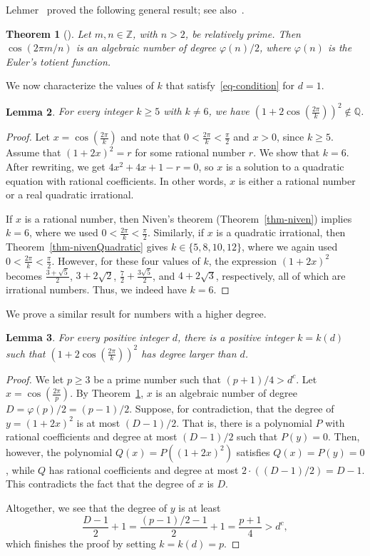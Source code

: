 \documentclass{article}
\newtheorem{theorem}{Theorem}
\newtheorem{lemma}[theorem]{Lemma}
\begin{document}
Lehmer~\cite{lehmer33} proved the following general result; see also~\cite{pss24}.

\begin{theorem}[\cite{lehmer33}]
\label{thm-lehmer}
Let $m, n \in \mathbb{Z}$, with $n > 2$, be relatively prime.
Then $\cos(2\pi m/n)$ is an algebraic
number of degree $\varphi(n)/2$, where $\varphi(n)$ is the Euler’s totient function.
\end{theorem}

We now characterize the values of $k$ that satisfy~\eqref{eq-condition} for $d=1$.

\begin{lemma}
\label{lem-classification}
For every integer $k \geq 5$ with $k \neq 6$, we have $\left(1+2\cos\left(\frac{2\pi}{k}\right)\right)^2 \notin \mathbb{Q}$.
\end{lemma}
\begin{proof}
Let $x=\cos\left(\frac{2\pi}{k}\right)$ and note that $0< \frac{2\pi}{k} < \frac{\pi}{2}$ and $x>0$, since $k \geq 5$.
Assume that $(1+2x)^2 = r$ for some rational number $r$.
We show that $k=6$.
After rewriting, we get $4x^2+4x+1-r=0$, so $x$ is a solution to a quadratic equation with rational coefficients.
In other words, $x$ is either a rational number or a real quadratic irrational.

If $x$ is a rational number, then Niven's theorem (Theorem~\ref{thm-niven}) implies $k = 6$, where we used $0<\frac{2\pi}{k}<\frac{\pi}{2}$.
Similarly, if $x$ is a quadratic irrational, then Theorem~\ref{thm-nivenQuadratic} gives $k \in \{5,8,10,12\}$, where we again used $0<\frac{2\pi}{k}<\frac{\pi}{2}$.
However, for these four values of $k$, the expression $(1+2x)^2$ becomes $\frac{3+\sqrt{5}}{2}$, $3+2\sqrt{2}$, $\frac{7}{2} +\frac{3\sqrt{5}}{2}$, and $4+2\sqrt{3}$, respectively, all of which are irrational numbers.
Thus, we indeed have $k=6$.
\end{proof}

We prove a similar result for numbers with a higher degree.

\begin{lemma}
\label{lem-higherDegree}
For every positive integer $d$, there is a positive integer $k = k(d)$ such that $\left(1+2\cos\left(\frac{2\pi}{k}\right)\right)^2$ has degree larger than $d$.
\end{lemma}
\begin{proof}
We let $p \geq 3$ be a prime number such that $(p+1)/4 > d^c$.
Let $x = \cos\left(\frac{2\pi}{p}\right)$.
By Theorem~\ref{thm-lehmer}, $x$ is an algebraic number of degree $D=\varphi(p)/2=(p-1)/2$.
Suppose, for contradiction, that the degree of $y=(1+2x)^2$ is at most $(D-1)/2$.
That is, there is a polynomial $P$ with rational coefficients and degree at most $(D-1)/2$ such that $P(y)=0$.
Then, however, the polynomial $Q(x) = P((1+2x)^2)$ satisfies $Q(x)=P(y)=0$, while $Q$ has rational coefficients and degree at most $2 \cdot ((D-1)/2)=D-1$.
This contradicts the fact that the degree of $x$ is $D$.

Altogether, we see that the degree of $y$ is at least 
\[\frac{D-1}{2}+1 = \frac{(p-1)/2-1}{2}+1 = \frac{p+1}{4} > d^c,\]
which finishes the proof by setting $k=k(d)=p$.
\end{proof}
\end{document}

